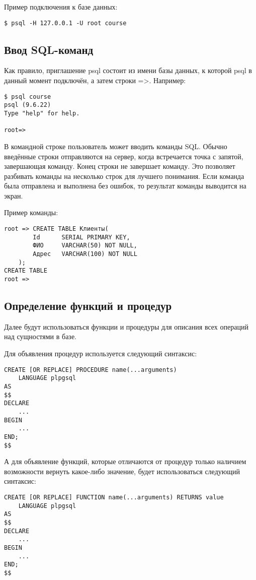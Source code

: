 \documentclass[14pt]{extarticle}
\begin{document}
    Пример подключения к базе данных:
    \begin{verbatim}
$ psql -H 127.0.0.1 -U root course
    \end{verbatim}

    \newpage
    \subsection{Ввод SQL-команд}

    Как правило, приглашение psql состоит из имени базы данных, к которой psql в данный момент подключён, а затем строки =>. Например:
    \begin{verbatim}
$ psql course
psql (9.6.22)
Type "help" for help.

root=>
    \end{verbatim}

    В командной строке пользователь может вводить команды SQL. Обычно введённые строки отправляются на сервер, когда встречается точка с запятой, завершающая команду. Конец строки не завершает команду. Это позволяет разбивать команды на несколько строк для лучшего понимания. Если команда была отправлена и выполнена без ошибок, то результат команды выводится на экран.

    Пример команды:
    \begin{verbatim}
root => CREATE TABLE Клиенты(
        Id      SERIAL PRIMARY KEY,
        ФИО     VARCHAR(50) NOT NULL,
        Адрес   VARCHAR(100) NOT NULL
    );
CREATE TABLE
root =>
    \end{verbatim}

    \newpage
    \subsection{Определение функций и процедур}

    Далее будут использоваться функции и процедуры для описания всех операций над сущностями в базе.

    Для объявления процедур используется следующий синтаксис:
    \begin{verbatim}
CREATE [OR REPLAСE] PROCEDURE name(...arguments)
    LANGUAGE plpgsql
AS
$$
DECLARE
    ...
BEGIN
    ...
END;
$$
    \end{verbatim}

    А для объявление функций, которые отличаются от процедур только наличием возможности вернуть какое-либо значение, будет использоваться следующий синтаксис:
    \begin{verbatim}
CREATE [OR REPLAСE] FUNCTION name(...arguments) RETURNS value
    LANGUAGE plpgsql
AS
$$
DECLARE
    ...
BEGIN
    ...
END;
$$
    \end{verbatim}
\end{document}
